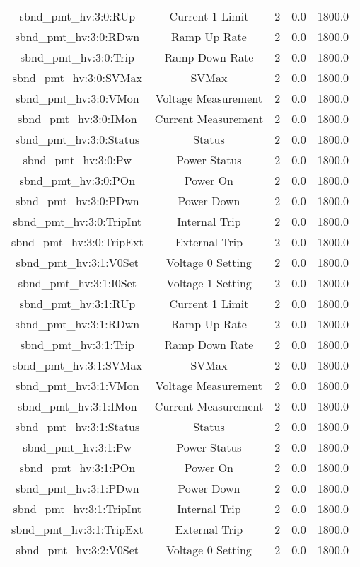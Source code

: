 \begin{table}[ptb]
\begin{tabular}{c | c c c c}
sbnd_pmt_hv:3:0:RUp & Current 1 Limit & 2 & 0.0 & 1800.0\\ 
sbnd_pmt_hv:3:0:RDwn & Ramp Up Rate & 2 & 0.0 & 1800.0\\ 
sbnd_pmt_hv:3:0:Trip & Ramp Down Rate & 2 & 0.0 & 1800.0\\ 
sbnd_pmt_hv:3:0:SVMax & SVMax & 2 & 0.0 & 1800.0\\ 
sbnd_pmt_hv:3:0:VMon & Voltage Measurement & 2 & 0.0 & 1800.0\\ 
sbnd_pmt_hv:3:0:IMon & Current Measurement & 2 & 0.0 & 1800.0\\ 
sbnd_pmt_hv:3:0:Status & Status & 2 & 0.0 & 1800.0\\ 
sbnd_pmt_hv:3:0:Pw & Power Status & 2 & 0.0 & 1800.0\\ 
sbnd_pmt_hv:3:0:POn & Power On & 2 & 0.0 & 1800.0\\ 
sbnd_pmt_hv:3:0:PDwn & Power Down & 2 & 0.0 & 1800.0\\ 
sbnd_pmt_hv:3:0:TripInt & Internal Trip & 2 & 0.0 & 1800.0\\ 
sbnd_pmt_hv:3:0:TripExt & External Trip & 2 & 0.0 & 1800.0\\ 
sbnd_pmt_hv:3:1:V0Set & Voltage 0 Setting & 2 & 0.0 & 1800.0\\ 
sbnd_pmt_hv:3:1:I0Set & Voltage 1 Setting & 2 & 0.0 & 1800.0\\ 
sbnd_pmt_hv:3:1:RUp & Current 1 Limit & 2 & 0.0 & 1800.0\\ 
sbnd_pmt_hv:3:1:RDwn & Ramp Up Rate & 2 & 0.0 & 1800.0\\ 
sbnd_pmt_hv:3:1:Trip & Ramp Down Rate & 2 & 0.0 & 1800.0\\ 
sbnd_pmt_hv:3:1:SVMax & SVMax & 2 & 0.0 & 1800.0\\ 
sbnd_pmt_hv:3:1:VMon & Voltage Measurement & 2 & 0.0 & 1800.0\\ 
sbnd_pmt_hv:3:1:IMon & Current Measurement & 2 & 0.0 & 1800.0\\ 
sbnd_pmt_hv:3:1:Status & Status & 2 & 0.0 & 1800.0\\ 
sbnd_pmt_hv:3:1:Pw & Power Status & 2 & 0.0 & 1800.0\\ 
sbnd_pmt_hv:3:1:POn & Power On & 2 & 0.0 & 1800.0\\ 
sbnd_pmt_hv:3:1:PDwn & Power Down & 2 & 0.0 & 1800.0\\ 
sbnd_pmt_hv:3:1:TripInt & Internal Trip & 2 & 0.0 & 1800.0\\ 
sbnd_pmt_hv:3:1:TripExt & External Trip & 2 & 0.0 & 1800.0\\ 
sbnd_pmt_hv:3:2:V0Set & Voltage 0 Setting & 2 & 0.0 & 1800.0\\ 

\end{tabular}
\end{table}
